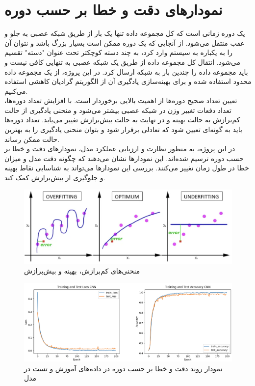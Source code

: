 \section{نمودار‌های دقت و خطا بر حسب دوره}
یک دوره زمانی است که کل مجموعه داده تنها یک بار از طریق شبکه عصبی به جلو و عقب منتقل می‌شود. از آنجایی که یک دوره ممکن است بسیار بزرگ باشد و نتوان آن را به یکباره به سیستم وارد کرد، به چند دسته کوچکتر تحت عنوان "دسته" تقسیم می‌شود. انتقال کل مجموعه داده از طریق یک شبکه عصبی به تنهایی کافی نیست و باید مجموعه داده را چندین بار به شبکه ارسال کرد. در این پروژه، از یک مجموعه داده محدود استفاده شده و برای بهینه‌سازی یادگیری آن از الگوریتم گرادیان کاهشی استفاده می‌کنیم.
\\
تعیین تعداد صحیح دوره‌ها از اهمیت بالایی برخوردار است. با افزایش تعداد دوره‌ها،‌ تعداد دفعات تغییر وزن در شبکه عصبی بیشتر می‌شود و منحنی یادگیری از حالت کم‌برازش به حالت بهینه و در نهایت به حالت بیش‌برازش تغییر می‌یابد. تعداد دوره‌ها باید به گونه‌ای تعیین شود که تعادلی برقرار شود و بتوان منحنی یادگیری را به بهترین حالت ممکن رساند.
\\
در این پروژه، به منظور نظارت و ارزیابی عملکرد مدل، نمودارهای دقت و خطا بر حسب دوره ترسیم شده‌اند. این نمودارها نشان می‌دهند که چگونه دقت مدل و میزان خطا در طول زمان تغییر می‌کنند. بررسی این نمودارها می‌تواند به شناسایی نقاط بهینه و جلوگیری از بیش‌برازش کمک کند.


\begin{figure}[h]
    \centering
    \includegraphics[width=1\textwidth]{fitting.png}
    \caption{منحنی‌های کم‌برازش، بهینه و بیش‌برازش}
\end{figure}


\begin{figure}[h]
    \centering
    \includegraphics[width=1\textwidth]{CNN.png}
    \caption{نمودار روند دقت و خطا بر حسب دوره در داده‌های آموزش و تست در مدل }
\end{figure}


